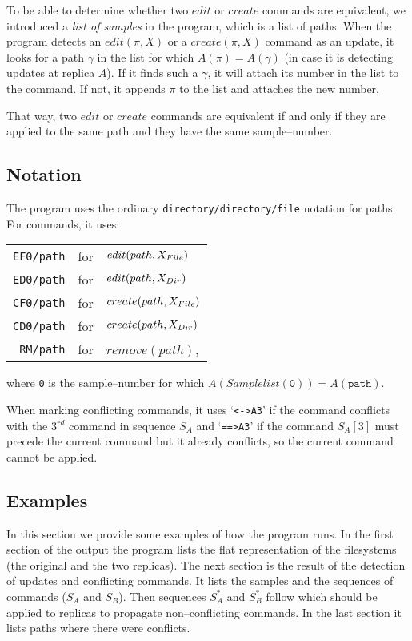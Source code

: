 To be able to determine whether two \(edit\) or \(create\) commands are
equivalent, we introduced a \emph{list of samples} in the program, which
is a list of paths.
When the program detects an \(edit(\pi,X)\) or a
\(create(\pi,X)\) command as an update, it looks for a path \(\gamma\) in
the list for
which \(A(\pi)=A(\gamma)\) (in case it is detecting updates at replica
\(A\)). If it finds such a \(\gamma\), it will attach its number in the
list to the command. If not, it appends \(\pi\) to the list and attaches
the new number.

That way, two \(edit\) or \(create\) commands are equivalent if and only
if they are applied to the same path and they have the same
sample--number.

\subsection{Notation}

The program uses the ordinary \texttt{directory/directory/file} notation
for paths. For commands, it uses:
\begin{center}\begin{tabular}{rcl}
\texttt{EF0/path} &for& \(edit(path,X_{File})\) \\
\texttt{ED0/path} &for& \(edit(path,X_{Dir})\) \\
\texttt{CF0/path} &for& \(create(path,X_{File})\) \\
\texttt{CD0/path} &for& \(create(path,X_{Dir})\) \\
\texttt{RM/path} &for& \(remove(path)\), 
\end{tabular}\end{center}
where \texttt{0} is the sample--number for which 
\(A(Samplelist(\texttt{0}))=A(\texttt{path})\).

When marking conflicting commands, it uses `\texttt{<->A3}' if the command
conflicts with the 3\({}^{rd}\) command in sequence \(S_A\) and
`\texttt{==>A3}' if the command \(S_A[3]\) must precede the current
command but it already conflicts, so the current command cannot be
applied.

\subsection{Examples}

In this section we provide some examples of how the program runs. In the
first section of the output the program lists the flat representation of
the filesystems (the original and the two replicas). The next section is
the result of the detection of updates and conflicting commands. It lists
the samples and the sequences of commands (\(S_A\) and \(S_B\)). Then
sequences \(S_A^*\) and \(S_B^*\) follow which should be applied to
replicas to propagate non--conflicting commands. In the last section it
lists paths where there were conflicts.

